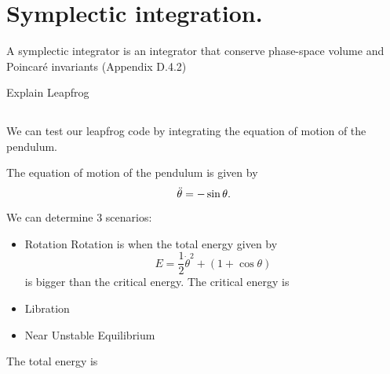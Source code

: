 \section{Symplectic integration.}

A symplectic integrator is an integrator that conserve phase-space volume and Poincar\' e invariants (Appendix D.4.2)

Explain Leapfrog 





\subsection{}
We can test our leapfrog code by integrating the equation of motion of the pendulum. 

The equation of motion of the pendulum is given by
\begin{equation}
    \Ddot{\theta}=-\sin\theta.
\end{equation}

We can determine 3 scenarios:
\begin{itemize}
    \item Rotation
    Rotation is when the total energy given by
    \begin{equation}
    E=\frac{1}{2}\Dot{\theta}^2+\left(1+\cos\theta\right)
    \end{equation}
    is bigger than the critical energy. The critical energy is 
    
    \item Libration
    \item Near Unstable Equilibrium
\end{itemize}

The total energy is




